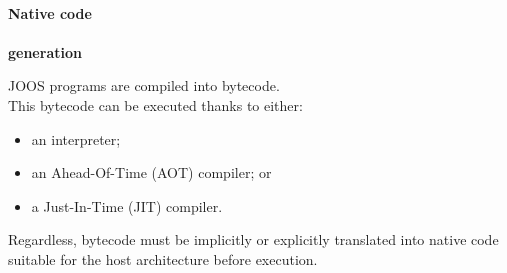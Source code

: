 



\begin{slide*}
\begin{tabbing}
~\\
{\Huge\bf Native code}\\ ~\\ {\Huge\bf generation}\\
\end{tabbing}
\vfil
\end{slide*}

\begin{slide*}
JOOS programs are compiled into bytecode.\\

This bytecode can be executed thanks to either:

\begin{itemize}
\item an interpreter;
\item an Ahead-Of-Time (AOT) compiler; or
\item a Just-In-Time (JIT) compiler.
\end{itemize}
\vspace*{1em}

Regardless, bytecode must be implicitly or explicitly translated into
native code suitable for the host architecture before execution.
\vfil
\end{slide*}
 
